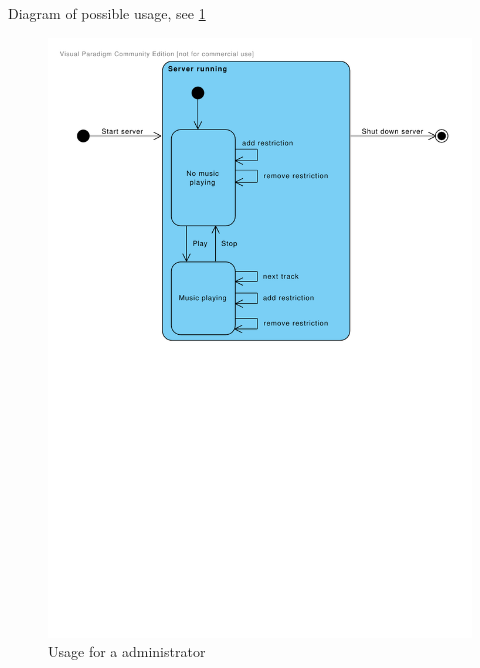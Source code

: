 Diagram of possible usage, see \cref{fig:UsageAdmin}
\begin{figure}
  \centering
  \includegraphics[width=0.7\linewidth]{Images/UsageAdmin.pdf}
  \caption{Usage for a administrator}
  \label{fig:UsageAdmin}
\end{figure}


